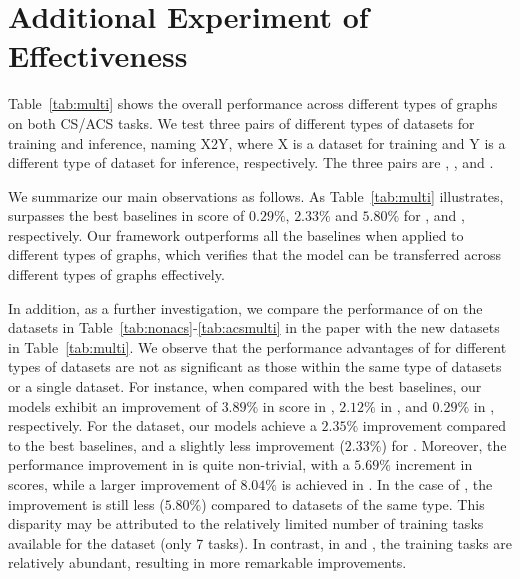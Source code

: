 \appendix
{}




\section*{Additional Experiment of Effectiveness}
Table~\ref{tab:multi} shows the overall performance across different types of graphs on both CS/ACS tasks. We test three pairs of different types of datasets for training and inference, naming X2Y, where X is a dataset for training and Y is a different type of dataset for inference, respectively. The three pairs are \Arxivproduct, \Twitterciteseer, and \Corafacebook.



We summarize our main observations as follows. 
As Table~\ref{tab:multi} illustrates, \IACS surpasses the best baselines in \Fone score of $0.29\%$, $2.33\%$ and $5.80\%$ for \Twitterciteseer, \Arxivproduct and \Corafacebook, respectively. Our \IACS framework outperforms all the baselines when applied to different types of graphs, which verifies that the model can be transferred across different types of graphs effectively. 
%

In addition, as a further investigation, we  compare the performance of \IACS on the datasets in Table~\ref{tab:nonacs}-\ref{tab:acsmulti} in the paper with the new datasets in Table~\ref{tab:multi}. We observe that the performance advantages of \IACS for different types of datasets are not as significant as those within the same type of datasets or a single dataset. For instance, when compared with the best baselines, our models exhibit an improvement of $3.89\%$ in \Fone score in \Citeseer, $2.12\%$ in \Coraciteseer, and $0.29\%$ in \Twitterciteseer, respectively. For the \Product dataset, our \IACS models achieve a $2.35\%$ improvement compared to the best baselines, and a slightly less improvement ($2.33\%$) for \Arxivproduct.
Moreover, the performance improvement in \Facebook is quite non-trivial, with a $5.69\%$ increment in \Fone scores, while a larger improvement of $8.04\%$ is achieved in \Twitterfacebook. In the case of \Corafacebook, the improvement is still less ($5.80\%$) compared to datasets of the same type. This disparity may be attributed to the relatively limited number of training tasks available for the \Facebook dataset (only 7 tasks). In contrast, in \Twitterfacebook and \Corafacebook, the training tasks are relatively abundant, resulting in more remarkable improvements.






